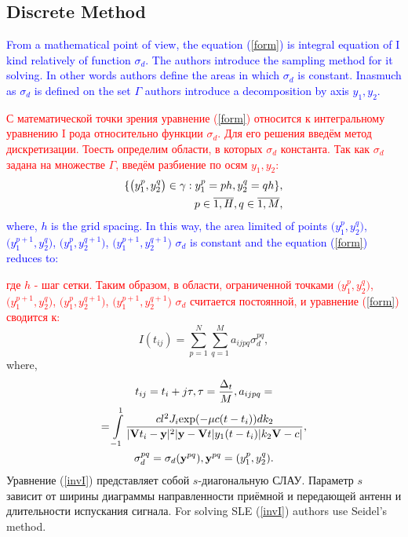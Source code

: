 \documentclass{procDDs}
\begin{document}
\subsection{Discrete Method}
\textcolor{blue}{From a mathematical point of view, the equation (\ref{form}) is integral equation of I kind relatively of function $\sigma_d$. The authors introduce the sampling method for it solving. In other words authors define the areas in which $\sigma_d$ is constant. Inasmuch as $\sigma_d$ is defined on the set $\Gamma$ authors introduce a decomposition by axis $y_1, y_2$.}

\textcolor{red}{С математической точки зрения уравнение (\ref{form}) относится к интегральному уравнению I рода относительно функции $\sigma_d$. Для его решения введём метод дискретизации. Тоесть определим области, в которых $\sigma_d$  константа. Так как $\sigma_d$ задана на множестве $\Gamma$, введём разбиение по осям $y_1, y_2$:}
\begin{align}
	\{ \big( y_1^p, y_2^q \big) \in\gamma: y_1^p = ph, y_2^q = qh \}, \notag \\ 
	p \in \overline{1, H}, q \in \overline{1, M}, 
\end{align}
\textcolor{blue}{
where, $h$ is the grid spacing. In this way, the area limited of points $\big(y_1^p, y_2^q\big)$, $\big(y_1^{p+1}, y_2^q\big)$, $\big(y_1^p, y_2^{q+1}\big)$, $\big(y_1^{p+1}, y_2^{q+1}\big)$ $\sigma_d$  is constant and the equation (\ref{form}) reduces to:}

\textcolor{red}{где $h$ - шаг сетки. Таким образом, в области, ограниченной точками $\big(y_1^p, y_2^q\big)$, $\big(y_1^{p+1}, y_2^q\big)$, $\big(y_1^p, y_2^{q+1}\big)$, $\big(y_1^{p+1}, y_2^{q+1}\big)$ $\sigma_d$ считается постоянной, и уравнение (\ref{form}) сводится к:}
\begin{equation}
\label{invI}
	I(t_{ij}) = \sum \limits_{p=1}^{N} \sum \limits_{q=1}^{M} a_{ijpq}\sigma_d^{pq},
\end{equation}
where,
\begin{multline*}
t_{ij} = t_i+j\tau, \tau = \frac{\Delta_t}{M}, a_{ijpq} = \\ 
=  \int\limits_{-1}^{1}
\frac{cl^2J_i \text{exp}(-\mu c(t-t_i))dk_2}{|\mathbf{V}t_i-\mathbf{y}|^2|\mathbf{y}-\mathbf{V}t|y_1(t-t_i)|k_2 \mathbf{V}-c|}, \\
\sigma_d^{pq} = \sigma_d(\textbf{y}^{pq}), \textbf{y}^{pq} = (y_1^p, y_2^q).
\end{multline*}
Уравнение (\ref{invI}) представляет собой $s$-диагональную СЛАУ. Параметр $s$ зависит от ширины диаграммы направленности приёмной и передающей антенн и длительности испускания сигнала. For solving SLE (\ref{invI}) authors use  Seidel's method.
\end{document}
